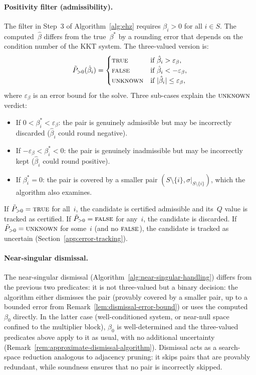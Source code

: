 \paragraph{Positivity filter (admissibility).}
The filter in Step~3 of Algorithm~\ref{alg:ehz} requires
$\beta_i > 0$ for all $i \in S$.
The computed~$\hat\beta$ differs from the true~$\beta^*$ by a
rounding error that depends on the condition number of the
KKT system.
The three-valued version is:
\[
  \tilde P_{>0}(\hat\beta_i) =
  \begin{cases}
    \textsc{true}
      & \text{if } \hat\beta_i > \varepsilon_\beta, \\
    \textsc{false}
      & \text{if } \hat\beta_i < -\varepsilon_\beta, \\
    \textsc{unknown}
      & \text{if } |\hat\beta_i| \leq \varepsilon_\beta,
  \end{cases}
\]
where $\varepsilon_\beta$ is an error bound for the solve.
Three sub-cases explain the $\textsc{unknown}$ verdict:
\begin{itemize}
\item If $0 < \beta^*_i < \varepsilon_\beta$:
  the pair is genuinely admissible but may be incorrectly
  discarded ($\hat\beta_i$ could round negative).
\item If $-\varepsilon_\beta < \beta^*_i < 0$:
  the pair is genuinely inadmissible but may be incorrectly
  kept ($\hat\beta_i$ could round positive).
\item If $\beta^*_i = 0$:
  the pair is covered by a smaller
  pair $(S \setminus \{i\}, \sigma|_{S \setminus \{i\}})$,
  which the algorithm also examines.
\end{itemize}
\noindent
If $\tilde P_{>0} = \textsc{true}$ for all~$i$, the candidate
is certified admissible and its~$Q$ value is tracked as
certified.
If $\tilde P_{>0} = \textsc{false}$ for any~$i$, the
candidate is discarded.
If $\tilde P_{>0} = \textsc{unknown}$ for some~$i$ (and no
$\textsc{false}$), the candidate is tracked as uncertain
(Section~\ref{app:error-tracking}).

\paragraph{Near-singular dismissal.}
The near-singular dismissal
(Algorithm~\ref{alg:near-singular-handling})
differs from the previous two predicates:
it is not three-valued but a binary decision:
the algorithm either dismisses the pair (provably covered
by a smaller pair, up to a bounded error from
Remark~\ref{lem:dismissal-error-bound}) or uses the
computed~$\beta_0$ directly.
In the latter case (well-conditioned system, or near-null
space confined to the multiplier block), $\beta_0$ is
well-determined and the three-valued predicates above
apply to it as usual, with no additional uncertainty
(Remark~\ref{rem:approximate-dismissal-algorithm}).
Dismissal acts as a search-space reduction analogous to
adjacency pruning: it skips pairs that are provably
redundant, while soundness ensures that no pair is
incorrectly skipped.

